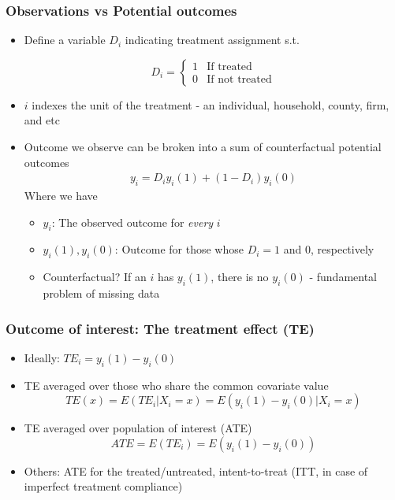 \documentclass[aspectratio=169]{beamer}
\begin{document}
\begin{frame}
\frametitle{Observations vs Potential outcomes}
\begin{itemize}
\item  Define a variable $D_i$ indicating treatment assignment s.t.

\[
D_i = \begin{cases} 1 & \text{If treated} \\ 0 & \text{If not treated}\end{cases}
\]
\item $i$ indexes the unit of the treatment - an individual, household,  county, firm, and etc
\item Outcome we observe can be broken into a sum of counterfactual potential outcomes
\begin{gather*}
y_i = D_iy_i(1) + (1-D_i)y_i(0)
\end{gather*}
Where we have
\begin{itemize}
\item $y_i$: The observed outcome for \emph{every} $i$
\item $y_i(1), y_i(0)$: Outcome for those whose $D_i=1$ and $0$, respectively
\item Counterfactual? If an $i$ has $y_i(1)$, there is no $y_i(0)$ - fundamental problem of missing data
\end{itemize}
\end{itemize}
\end{frame}

\begin{frame}
\frametitle{Outcome of interest: The treatment effect (TE)}
\begin{itemize}
\item Ideally: $TE_i=y_i(1)-y_i(0)$
\item TE averaged over those who share the common covariate value
\[
TE(x) = E(TE_i|X_i=x) = E(y_i(1)-y_i(0)|X_i=x)
\]
\item TE averaged over population of interest (ATE)
\[
ATE=E(TE_i)=E(y_i(1)-y_i(0))
\]
\item Others: ATE for the treated/untreated, intent-to-treat (ITT,  in case of imperfect treatment compliance)
\end{itemize}
\end{frame}
\end{document}
